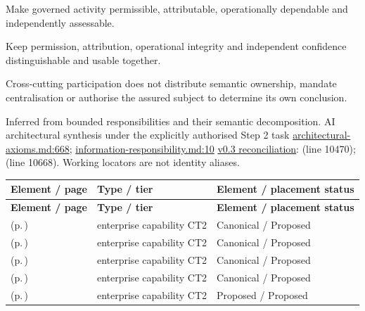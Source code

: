 Make governed activity permissible, attributable, operationally dependable and independently assessable.



Keep permission, attribution, operational integrity and independent confidence distinguishable and usable together.



Cross-cutting participation does not distribute semantic ownership, mandate centralisation or authorise the assured subject to determine its own conclusion.


Inferred from bounded responsibilities and their semantic decomposition. AI architectural synthesis under the explicitly authorised Step 2 task \hyperref[evidence:27549d51551beae6]{architectural-axioms.md:668}; \hyperref[evidence:be61392fefb4bb10]{information-responsibility.md:10}
\hyperref[model:reconciliation]{v0.3 reconciliation}: \texttt{} (line 10470); \texttt{} (line 10668). Working locators are not identity aliases.
\begingroup\small\setlength{\TableWidth}{\dimexpr\linewidth-6\tabcolsep-4\arrayrulewidth\relax}
\begin{longtable}{|>{\raggedright\arraybackslash}p{0.52\TableWidth}|>{\raggedright\arraybackslash}p{0.2\TableWidth}|>{\raggedright\arraybackslash}p{0.28\TableWidth}|}
\hline\rowcolor{TableHead}\textbf{Element / page} & \textbf{Type / tier} & \textbf{Element / placement status}\\\hline\endfirsthead
\hline\rowcolor{TableHead}\textbf{Element / page} & \textbf{Type / tier} & \textbf{Element / placement status}\\\hline\endhead
\hline\endfoot
\nameref{cap:ec-06} (p.\,\pageref{cap:ec-06}) & enterprise capability CT2 & Canonical / Proposed\\\hline
\nameref{cap:ec-07} (p.\,\pageref{cap:ec-07}) & enterprise capability CT2 & Canonical / Proposed\\\hline
\nameref{cap:ec-12} (p.\,\pageref{cap:ec-12}) & enterprise capability CT2 & Canonical / Proposed\\\hline
\nameref{cap:ec-14} (p.\,\pageref{cap:ec-14}) & enterprise capability CT2 & Canonical / Proposed\\\hline
\nameref{cap:ec-information-authority-qualification} (p.\,\pageref{cap:ec-information-authority-qualification}) & enterprise capability CT2 & Proposed / Proposed\\\hline
\end{longtable}\endgroup


